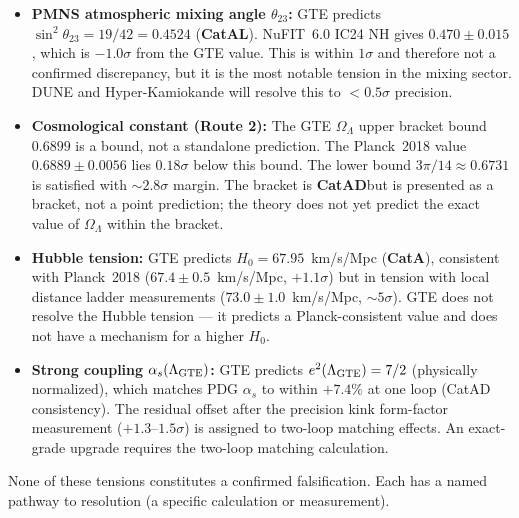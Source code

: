 \documentclass[11pt,a4paper]{article}
\newcommand{\CatAL}{\textbf{CatAL}}
\newcommand{\CatAD}{\textbf{CatAD}}
\newcommand{\CatA}{\textbf{CatA}}
\begin{document}
\begin{tcolorbox}[colback=boxyellow,colframe=orange!60!black,
  title=Current tensions in the GTE prediction register, breakable]
\begin{itemize}[itemsep=4pt]
  \item \textbf{PMNS atmospheric mixing angle $\theta_{23}$:}
    GTE predicts $\sin^2\!\theta_{23} = 19/42 = 0.4524$ (\CatAL).
    NuFIT~6.0 IC24 NH gives $0.470 \pm 0.015$, which is $-1.0\sigma$ from
    the GTE value.  This is within $1\sigma$ and therefore not a confirmed
    discrepancy, but it is the most notable tension in the mixing sector.
    DUNE and Hyper-Kamiokande will resolve this to $<0.5\sigma$ precision.

  \item \textbf{Cosmological constant (Route 2):}
    The GTE $\Omega_\Lambda$ upper bracket bound $0.6899$ is a bound, not a
    standalone prediction.  The Planck~2018 value $0.6889 \pm 0.0056$ lies
    $0.18\sigma$ below this bound.  The lower bound $3\pi/14 \approx 0.6731$
    is satisfied with $\sim 2.8\sigma$ margin.  The bracket is \CatAD but
    is presented as a bracket, not a point prediction; the theory does not yet
    predict the exact value of $\Omega_\Lambda$ within the bracket.

  \item \textbf{Hubble tension:}
    GTE predicts $H_0 = 67.95$~km/s/Mpc (\CatA), consistent with Planck~2018
    ($67.4 \pm 0.5$~km/s/Mpc, $+1.1\sigma$) but in tension with local distance
    ladder measurements ($73.0 \pm 1.0$~km/s/Mpc, $\sim 5\sigma$).  GTE does
    not resolve the Hubble tension — it predicts a Planck-consistent value and
    does not have a mechanism for a higher $H_0$.

  \item \textbf{Strong coupling $\alpha_s(\Lambda_{\rm GTE})$:}
    GTE predicts $e^2(\Lambda_{\rm GTE}) = 7/2$ (physically normalized),
    which matches PDG $\alpha_s$ to within $+7.4\%$ at one loop (CatAD
    consistency).  The residual offset after the precision kink form-factor
    measurement ($+1.3$--$1.5\sigma$) is assigned to two-loop matching effects.
    An exact-grade upgrade requires the two-loop matching calculation.
\end{itemize}
\end{tcolorbox}

None of these tensions constitutes a confirmed falsification.  Each has a named
pathway to resolution (a specific calculation or measurement).
\end{document}
